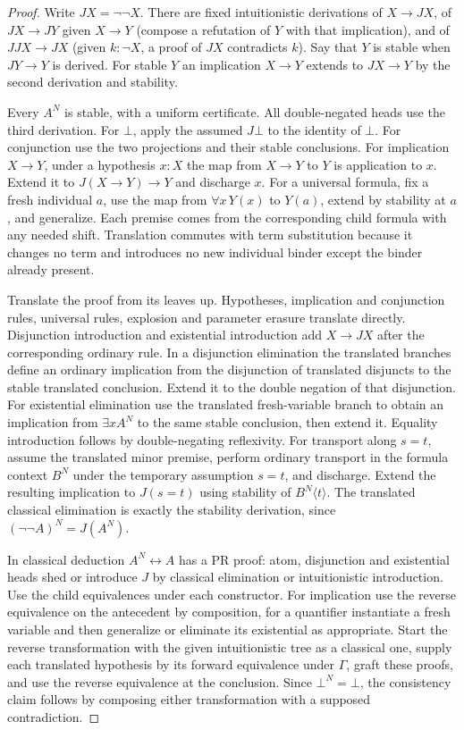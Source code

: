 \begin{proof}
Write $JX=\neg\neg X$. There are fixed intuitionistic derivations of $X\to JX$, of $JX\to JY$ given $X\to Y$ (compose a refutation of $Y$ with that implication), and of $JJX\to JX$ (given $k:\neg X$, a proof of $JX$ contradicts $k$). Say that $Y$ is stable when $JY\to Y$ is derived. For stable $Y$ an implication $X\to Y$ extends to $JX\to Y$ by the second derivation and stability.

Every $A^N$ is stable, with a uniform certificate. All double-negated heads use the third derivation. For $\bot$, apply the assumed $J\bot$ to the identity of $\bot$. For conjunction use the two projections and their stable conclusions. For implication $X\to Y$, under a hypothesis $x:X$ the map from $X\to Y$ to $Y$ is application to $x$. Extend it to $J(X\to Y)\to Y$ and discharge $x$. For a universal formula, fix a fresh individual $a$, use the map from $\forall x\,Y(x)$ to $Y(a)$, extend by stability at $a$, and generalize. Each premise comes from the corresponding child formula with any needed shift. Translation commutes with term substitution because it changes no term and introduces no new individual binder except the binder already present.

Translate the proof from its leaves up. Hypotheses, implication and conjunction rules, universal rules, explosion and parameter erasure translate directly. Disjunction introduction and existential introduction add $X\to JX$ after the corresponding ordinary rule. In a disjunction elimination the translated branches define an ordinary implication from the disjunction of translated disjuncts to the stable translated conclusion. Extend it to the double negation of that disjunction. For existential elimination use the translated fresh-variable branch to obtain an implication from $\exists x A^N$ to the same stable conclusion, then extend it. Equality introduction follows by double-negating reflexivity. For transport along $s=t$, assume the translated minor premise, perform ordinary transport in the formula context $B^N$ under the temporary assumption $s=t$, and discharge. Extend the resulting implication to $J(s=t)$ using stability of $B^N\langle t\rangle$. The translated classical elimination is exactly the stability derivation, since $(\neg\neg A)^N=J(A^N)$.

In classical deduction $A^N\leftrightarrow A$ has a PR proof: atom, disjunction and existential heads shed or introduce $J$ by classical elimination or intuitionistic introduction. Use the child equivalences under each constructor. For implication use the reverse equivalence on the antecedent by composition, for a quantifier instantiate a fresh variable and then generalize or eliminate its existential as appropriate. Start the reverse transformation with the given intuitionistic tree as a classical one, supply each translated hypothesis by its forward equivalence under $\Gamma$, graft these proofs, and use the reverse equivalence at the conclusion. Since $\bot^N=\bot$, the consistency claim follows by composing either transformation with a supposed contradiction.


\end{proof}
